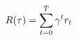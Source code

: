 \documentclass[preview]{standalone}
\begin{document}
\begin{align*}
\special{dvisvgm:raw <g id='unique000'>}R(\tau) = \sum_{t=0}^{T} \gamma^t r_t\special{dvisvgm:raw </g>}
\end{align*}
\end{document}
